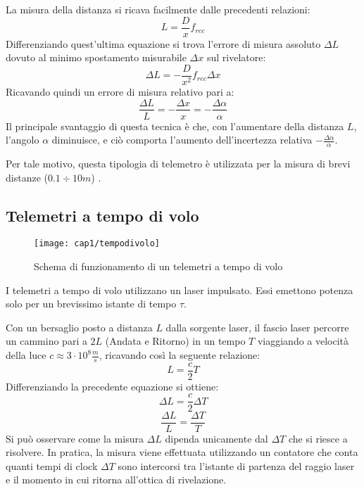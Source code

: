 La misura della distanza si ricava facilmente dalle precedenti relazioni:
\begin{equation}
  L=\frac{D}{x}f_{rec}
\end{equation}
Differenziando quest'ultima equazione si trova l'errore di misura assoluto $\Delta L$ dovuto al minimo spostamento misurabile $\Delta x$ sul rivelatore: 
\begin{equation}
	 \Delta L=-\frac{D}{x^2}f_{rec}\Delta x
\end{equation}
Ricavando quindi un errore di misura relativo pari a:
\begin{equation}
\frac{\Delta L}{L}=-\frac{\Delta x}{x}=-\frac{\Delta\alpha}{\alpha}
\end{equation}
Il principale svantaggio di questa tecnica è che, con l'aumentare della distanza $L$, l'angolo $\alpha$ diminuisce, e ciò comporta l'aumento dell'incertezza relativa $-\frac{\Delta\alpha}{\alpha}$.
 
Per tale motivo, questa tipologia di telemetro è utilizzata per la misura di brevi distanze ($0.1\div 10 m$) .

\subsection{Telemetri a tempo di volo}
\begin{figure}[H]
	\begin{center}
		\texttt{[image: cap1/tempodivolo]}
		\caption{Schema di funzionamento di un telemetri a tempo di volo}
		\label{tempodivolo}
	\end{center}
\end{figure}
I telemetri a tempo di volo utilizzano un laser impulsato. Essi emettono potenza solo per un brevissimo istante di tempo $\tau$.

Con un bersaglio posto a distanza $L$ dalla sorgente laser, il fascio laser percorre un cammino pari a $2L$ (Andata e Ritorno) in un tempo $T$ viaggiando a velocità della luce $c\approx3\cdot10^8\frac{m}{s}$, ricavando così la seguente relazione:
\begin{equation}
  L=\frac{c}{2}T
\end{equation}
Differenziando la precedente equazione si ottiene:
\begin{equation}
  \Delta L=\frac{c}{2}\Delta T
\end{equation}
\begin{equation}
  \frac{\Delta L}{L}=\frac{\Delta T}{T}
\end{equation}
Si può osservare come la misura $\Delta L$ dipenda unicamente dal $\Delta T$ che si riesce a risolvere. In pratica, la misura viene effettuata utilizzando un contatore che conta quanti tempi di clock $\Delta T$ sono intercorsi tra l'istante di partenza del raggio laser e il momento in cui ritorna all'ottica di rivelazione.

